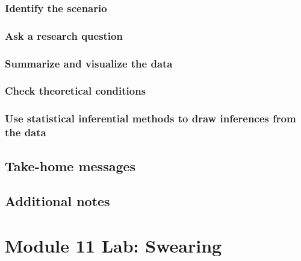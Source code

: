 \documentclass[
]{report}
\begin{document}
\subsubsection*{Identify the scenario}\label{identify-the-scenario}

\subsubsection*{Ask a research question}\label{ask-a-research-question-5}

\subsubsection*{Summarize and visualize the data}\label{summarize-and-visualize-the-data-4}

\subsubsection*{Check theoretical conditions}\label{check-theoretical-conditions-1}

\subsubsection*{Use statistical inferential methods to draw inferences from the data}\label{use-statistical-inferential-methods-to-draw-inferences-from-the-data-3}

\subsection{Take-home messages}\label{take-home-messages-21}

\subsection{Additional notes}\label{additional-notes-22}

\section{Module 11 Lab: Swearing}\label{module-11-lab-swearing}
\end{document}

